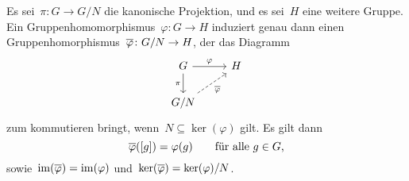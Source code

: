 \begin{theorem}[Homomorphiesatz]
  Es sei~$\pi \colon G \to G/N$ die kanonische Projektion, und es sei~$H$ eine weitere Gruppe.
  Ein Gruppenhomomorphismus~$\varphi \colon G \to H$ induziert genau dann einen Gruppenhomorphismus~$\induced{\varphi} \colon G/N \to H$, der das Diagramm
  \[
    \begin{tikzcd}
      G
      \arrow{r}[above]{\varphi}
      \arrow{d}[left]{\pi}
      &
      H
      \\
      G/N
      \arrow[dashed]{ur}[below right]{\induced{\varphi}}
      &
      {}
    \end{tikzcd}
  \]
  zum kommutieren bringt, wenn~$N \subseteq \ker(\varphi)$ gilt.
  Es gilt dann
  \[
    \overline{\varphi}( [g] )
    =
    \varphi(g)
    \qquad
    \text{für alle~$g \in G$,}
  \]
  sowie~$\operatorname{im}(\overline{\varphi}) = \operatorname{im}(\varphi)$ und~$\ker(\overline{\varphi}) = \ker(\varphi)/N$.

\end{theorem}

